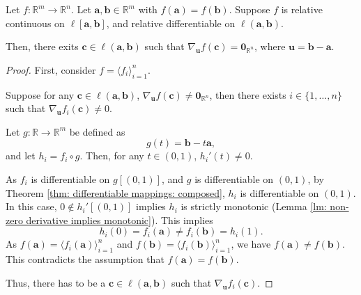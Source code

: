 \begin{lemma}
	\label{lm: rolle's theorem}
	
	Let $f: \mathbb R^m \to \mathbb R^n$. Let $\mathbf a, \mathbf b \in \mathbb R^m$ with $f(\mathbf a) = f(\mathbf b)$. Suppose $f$ is relative continuous on $\ell[\mathbf a, \mathbf b]$, and relative differentiable on $\ell(\mathbf a, \mathbf b)$. 
	
	Then, there exits $\mathbf c \in \ell(\mathbf a, \mathbf b)$ such that $\nabla_{\mathbf u} f(\mathbf c) = \mathbf 0_{\mathbb R^n}$, where $\mathbf u = \mathbf b - \mathbf a$.
	
	\begin{proof}
		First, consider $f = \langle f_i \rangle_{i = 1}^n$.
		
		Suppose for any $\mathbf c \in \ell(\mathbf a, \mathbf b)$, $\nabla_{\mathbf u} f(\mathbf c) \ne \mathbf 0_{\mathbb R^n}$, then there exists $i \in \{1, \ldots, n\}$ such that $\nabla_{\mathbf u}f_i(\mathbf c) \ne 0$.
		
		Let $g: \mathbb R \to \mathbb R^m$ be defined as
		$$
		g(t) = \mathbf b - t\mathbf a,
		$$
		and let $h_i = f_i \circ g$. Then, for any $t \in (0, 1)$, $h_i'(t) \ne 0$.
		
		As $f_i$ is differentiable on $g[(0,1)]$, and $g$ is differentiable on $(0,1)$, by Theorem \ref{thm: differentiable mappings: composed}, $h_i$ is differentiable on $(0,1)$. In this case, $0 \notin h_i'[(0,1)]$ implies $h_i$ is strictly monotonic (Lemma \ref{lm: non-zero derivative implies monotonic}). This implies
		$$
		h_i(0) = f_i(\mathbf a) \ne f_i(\mathbf b) = h_i(1).
		$$
		As $f(\mathbf a) = \langle f_i(\mathbf a) \rangle_{i = 1}^n$ and $f(\mathbf b) = \langle f_i(\mathbf b) \rangle_{i = 1}^n$, we have $f(\mathbf a) \ne f(\mathbf b)$. This contradicts the assumption that $f(\mathbf a) = f(\mathbf b)$.
		
		Thus, there has to be a $\mathbf c \in \ell(\mathbf a, \mathbf b)$ such that $\nabla_{\mathbf u} f_i(\mathbf c)$.
	\end{proof}
\end{lemma}


